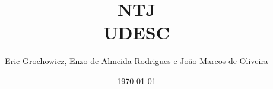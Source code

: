 \documentclass[11pt, a4paper, twoside]{article}
\title{NTJ \\ UDESC}
\author{Eric Grochowicz, Enzo de Almeida Rodrigues e João Marcos de Oliveira}
\begin{document}
\date{\today}
\maketitle


\renewcommand{\contentsname}{Índice} %
\tableofcontents
\end{document}
